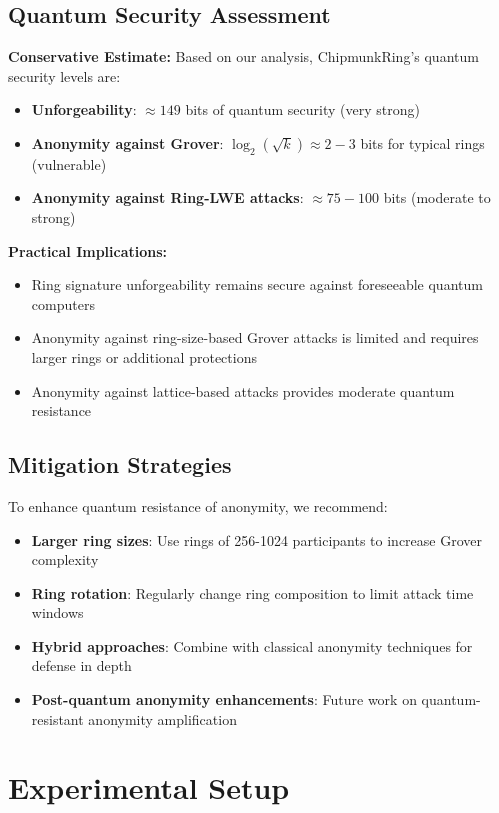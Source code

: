 \documentclass[11pt,a4paper]{article}
\begin{document}
\subsection{Quantum Security Assessment}

\textbf{Conservative Estimate:} Based on our analysis, ChipmunkRing's quantum security levels are:

\begin{itemize}
\item \textbf{Unforgeability}: $\approx 149$ bits of quantum security (very strong)
\item \textbf{Anonymity against Grover}: $\log_2(\sqrt{k}) \approx 2-3$ bits for typical rings (vulnerable)
\item \textbf{Anonymity against Ring-LWE attacks}: $\approx 75-100$ bits (moderate to strong)
\end{itemize}

\textbf{Practical Implications:}
\begin{itemize}
\item Ring signature unforgeability remains secure against foreseeable quantum computers
\item Anonymity against ring-size-based Grover attacks is limited and requires larger rings or additional protections
\item Anonymity against lattice-based attacks provides moderate quantum resistance
\end{itemize}

\subsection{Mitigation Strategies}

To enhance quantum resistance of anonymity, we recommend:

\begin{itemize}
\item \textbf{Larger ring sizes}: Use rings of 256-1024 participants to increase Grover complexity
\item \textbf{Ring rotation}: Regularly change ring composition to limit attack time windows
\item \textbf{Hybrid approaches}: Combine with classical anonymity techniques for defense in depth
\item \textbf{Post-quantum anonymity enhancements}: Future work on quantum-resistant anonymity amplification
\end{itemize}

\section{Experimental Setup}
\end{document}
